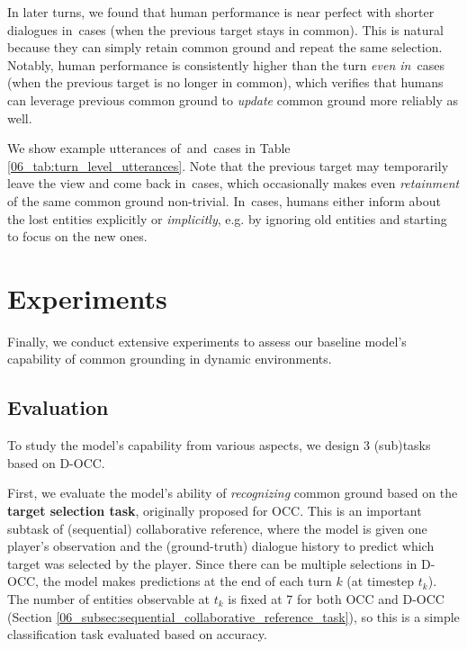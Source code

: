In later turns, we found that human performance is near perfect with shorter dialogues in \cmark\,cases (when the previous target stays in common). This is natural because they can simply retain common ground and repeat the same selection. Notably, human performance is consistently higher than the  turn \textit{even in} \xmark\,cases (when the previous target is no longer in common), which verifies that humans can leverage previous common ground to \textit{update} common ground more reliably as well.

We show example utterances of \cmark\,and \xmark\,cases in Table \ref{06_tab:turn_level_utterances}. Note that the previous target may temporarily leave the view and come back in \cmark\,cases, which occasionally makes even \textit{retainment} of the same common ground non-trivial. In \xmark\,cases, humans either inform about the lost entities explicitly or \textit{implicitly}, e.g. by ignoring old entities and starting to focus on the new ones.


\section{Experiments}
\label{06_sec:experiments}

Finally, we conduct extensive experiments to assess our baseline model's capability of common grounding in dynamic environments.

\subsection{Evaluation}
\label{06_subsec:evaluation}

To study the model's capability from various aspects, we design 3 (sub)tasks based on D-OCC.

First, we evaluate the model's ability of \textit{recognizing} common ground based on the \textbf{target selection task}, originally proposed for OCC. This is an important subtask of (sequential) collaborative reference, where the model is given one player's observation and the (ground-truth) dialogue history to predict which target was selected by the player. Since there can be multiple selections in D-OCC, the model makes predictions at the end of each turn $k$ (at timestep $t_k$). The number of entities observable at $t_k$ is fixed at 7 for both OCC and D-OCC (Section \ref{06_subsec:sequential_collaborative_reference_task}), so this is a simple classification task evaluated based on accuracy.

